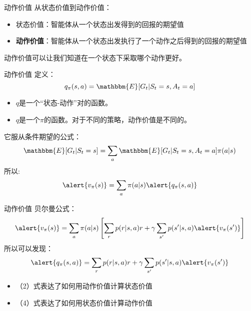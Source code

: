 \begin{frame}{动作价值}
    从状态价值到动作价值：
    \begin{itemize}
        \item 状态价值：智能体从一个状态出发得到的回报的期望值
        \item \textbf{动作价值}：智能体从一个状态出发执行了一个动作之后得到的回报的期望值
    \end{itemize}
    动作价值可以让我们知道在一个状态下采取哪个动作更好。
\end{frame}

\begin{frame}{动作价值}
    定义：
    \[
        q_\pi(s,a)=\mathbbm{E}[G_t|S_t=s,A_t=a]
    \]
    \begin{itemize}
        \item $q$是一个“状态-动作”对的函数。
        \item $q$是一个$\pi$的函数。对于不同的策略，动作价值是不同的。
    \end{itemize}
    它服从条件期望的公式：
    \begin{equation}
        \mathbbm{E}[G_t|S_t=s]=\sum_a\mathbbm{E}[G_t|S_t=s,A_t=a]\pi(a|s)
    \end{equation}
    所以:
    \begin{equation}
        \alert{v_\pi(s)}=\sum_a \pi(a|s)\alert{q_\pi(s,a)}
    \end{equation}
\end{frame}

\begin{frame}{动作价值}
    贝尔曼公式：
    \begin{equation}
        \alert{v_\pi(s)}=\sum_a\pi(a|s)\left[\sum_r p(r|s,a)r+\gamma\sum_{s'}p(s'|s,a)\alert{v_{\pi}(s')}\right]
    \end{equation}
    所以可以发现：
    \begin{equation}
        \alert{q_\pi(s,a)}=\sum_r p(r|s,a)r+\gamma\sum_{s'}p(s'|s,a)\alert{v_{\pi}(s')}
    \end{equation}
    \begin{itemize}
        \item （2）式表达了如何用动作价值计算状态价值
        \item （4）式表达了如何用状态价值计算动作价值
    \end{itemize}
\end{frame}

